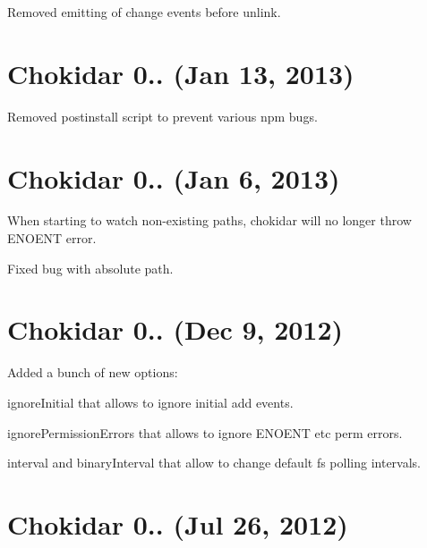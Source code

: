 \begin{DoxyItemize}
\item Removed emitting of {\ttfamily change} events before {\ttfamily unlink}.
\end{DoxyItemize}

\section*{Chokidar 0.. (Jan 13, 2013)}


\begin{DoxyItemize}
\item Removed postinstall script to prevent various npm bugs.
\end{DoxyItemize}

\section*{Chokidar 0.. (Jan 6, 2013)}


\begin{DoxyItemize}
\item When starting to watch non-\/existing paths, chokidar will no longer throw E\+N\+O\+E\+NT error.
\item Fixed bug with absolute path.
\end{DoxyItemize}

\section*{Chokidar 0.. (Dec 9, 2012)}


\begin{DoxyItemize}
\item Added a bunch of new options\+:
\begin{DoxyItemize}
\item {\ttfamily ignore\+Initial} that allows to ignore initial {\ttfamily add} events.
\item {\ttfamily ignore\+Permission\+Errors} that allows to ignore E\+N\+O\+E\+NT etc perm errors.
\item {\ttfamily interval} and {\ttfamily binary\+Interval} that allow to change default fs polling intervals.
\end{DoxyItemize}
\end{DoxyItemize}

\section*{Chokidar 0.. (Jul 26, 2012)}


